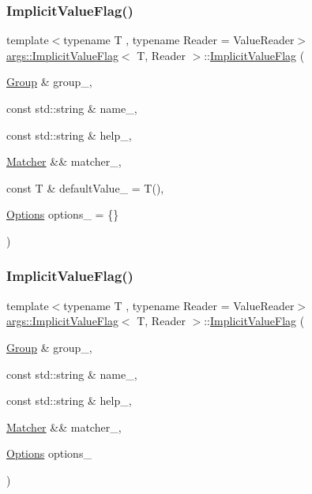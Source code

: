 \subsubsection{\texorpdfstring{Implicit\+Value\+Flag()}{ImplicitValueFlag()}\hspace{0.1cm}{\footnotesize\ttfamily [2/3]}}
{\footnotesize\ttfamily template$<$typename T , typename Reader  = Value\+Reader$>$ \\
\hyperlink{classargs_1_1_implicit_value_flag}{args\+::\+Implicit\+Value\+Flag}$<$ T, Reader $>$\+::\hyperlink{classargs_1_1_implicit_value_flag}{Implicit\+Value\+Flag} (\begin{DoxyParamCaption}\item[{\hyperlink{classargs_1_1_group}{Group} \&}]{group\+\_\+,  }\item[{const std\+::string \&}]{name\+\_\+,  }\item[{const std\+::string \&}]{help\+\_\+,  }\item[{\hyperlink{classargs_1_1_matcher}{Matcher} \&\&}]{matcher\+\_\+,  }\item[{const T \&}]{default\+Value\+\_\+ = {\ttfamily T()},  }\item[{\hyperlink{namespaceargs_aa530c0f95194aa275f49a5f299ac9e77}{Options}}]{options\+\_\+ = {\ttfamily \{\}} }\end{DoxyParamCaption})\hspace{0.3cm}{\ttfamily [inline]}}

\mbox{\label{classargs_1_1_implicit_value_flag_aa83bd9cd565c0e265e293c856ae0d119}} 
\subsubsection{\texorpdfstring{Implicit\+Value\+Flag()}{ImplicitValueFlag()}\hspace{0.1cm}{\footnotesize\ttfamily [3/3]}}
{\footnotesize\ttfamily template$<$typename T , typename Reader  = Value\+Reader$>$ \\
\hyperlink{classargs_1_1_implicit_value_flag}{args\+::\+Implicit\+Value\+Flag}$<$ T, Reader $>$\+::\hyperlink{classargs_1_1_implicit_value_flag}{Implicit\+Value\+Flag} (\begin{DoxyParamCaption}\item[{\hyperlink{classargs_1_1_group}{Group} \&}]{group\+\_\+,  }\item[{const std\+::string \&}]{name\+\_\+,  }\item[{const std\+::string \&}]{help\+\_\+,  }\item[{\hyperlink{classargs_1_1_matcher}{Matcher} \&\&}]{matcher\+\_\+,  }\item[{\hyperlink{namespaceargs_aa530c0f95194aa275f49a5f299ac9e77}{Options}}]{options\+\_\+ }\end{DoxyParamCaption})\hspace{0.3cm}{\ttfamily [inline]}}

